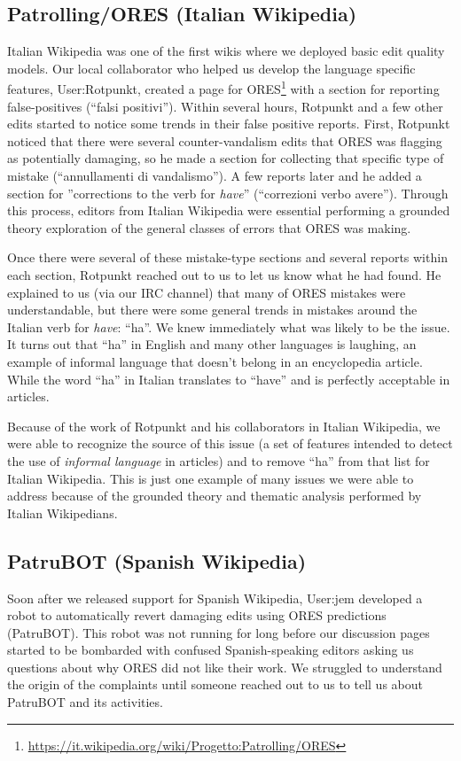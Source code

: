 \subsection{Patrolling/ORES (Italian Wikipedia)}
Italian Wikipedia was one of the first wikis where we deployed basic edit quality models.  Our local collaborator who helped us develop the language specific features, User:Rotpunkt, created a page for ORES\footnote{\url{https://it.wikipedia.org/wiki/Progetto:Patrolling/ORES}} with a section for reporting false-positives (``falsi positivi'').  Within several hours, Rotpunkt and a few other edits started to notice some trends in their false positive reports.  First, Rotpunkt noticed that there were several counter-vandalism edits that ORES was flagging as potentially damaging, so he made a section for collecting that specific type of mistake (``annullamenti di vandalismo'').  A few reports later and he added a section for ''corrections to the verb for \emph{have}'' (``correzioni verbo avere'').  Through this process, editors from Italian Wikipedia were essential performing a grounded theory exploration of the general classes of errors that ORES was making.

Once there were several of these mistake-type sections and several reports within each section, Rotpunkt reached out to us to let us know what he had found.  He explained to us (via our IRC channel) that many of ORES mistakes were understandable, but there were some general trends in mistakes around the Italian verb for \emph{have}: ``ha''.  We knew immediately what was likely to be the issue.  It turns out that ``ha'' in English and many other languages is laughing, an example of informal language that doesn't belong in an encyclopedia article.  While the word ``ha'' in Italian translates to ``have'' and is perfectly acceptable in articles.

Because of the work of Rotpunkt and his collaborators in Italian Wikipedia, we were able to recognize the source of this issue (a set of features intended to detect the use of \emph{informal language} in articles) and to remove ``ha'' from that list for Italian Wikipedia.  This is just one example of many issues we were able to address because of the grounded theory and thematic analysis performed by Italian Wikipedians.

\subsection{PatruBOT (Spanish Wikipedia)}
Soon after we released support for Spanish Wikipedia, User:jem developed a robot to automatically revert damaging edits using ORES predictions (PatruBOT).  This robot was not running for long before our discussion pages started to be bombarded with confused Spanish-speaking editors asking us questions about why ORES did not like their work.  We struggled to understand the origin of the complaints until someone reached out to us to tell us about PatruBOT and its activities.

